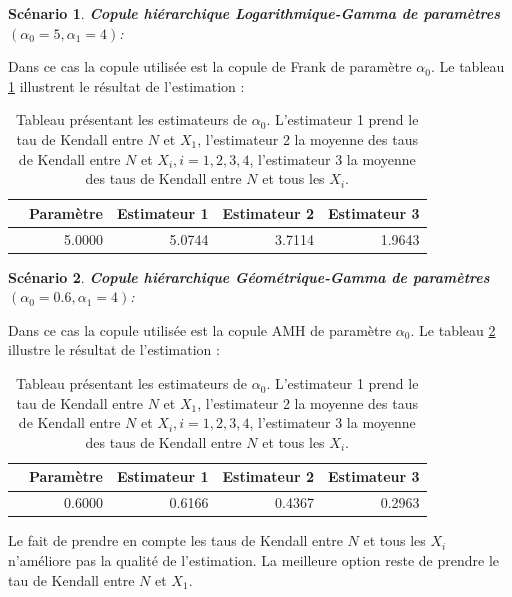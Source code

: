 \documentclass{article}
\newtheorem{scenario}{Scénario}
\begin{document}
	\begin{scenario}
		\textbf{Copule hiérarchique Logarithmique-Gamma de paramètres $(\alpha_{0}=5,\alpha_{1}=4)$}:
		\label{scenario_log-gamma}
	\end{scenario}
	
	Dans ce cas la copule utilisée est la copule de Frank de paramètre $\alpha_{0}$. Le tableau \ref{MCR_Frank} illustrent le résultat de l'estimation :
	
	\begin{table}[ht]
		\centering
		\begin{tabular}{rrrrr}
			\hline
			& Paramètre & Estimateur 1 & Estimateur 2 & Estimateur 3 \\ 
			\hline
			& 5.0000 & 5.0744 & 3.7114 & 1.9643 \\
			\hline
		\end{tabular}
		\caption{Tableau présentant les estimateurs de $\alpha_{0}$. L'estimateur 1 prend le tau de Kendall entre $N$ et $X_{1}$, l'estimateur 2 la moyenne des taus de Kendall entre $N$ et $X_{i},i=1,2,3,4$, l'estimateur 3 la moyenne des taus de Kendall entre $N$ et tous les $X_{i}$. }
		\label{MCR_Frank}
	\end{table}
	
	\begin{scenario}
		\textbf{Copule hiérarchique Géométrique-Gamma de paramètres $(\alpha_{0}=0.6,\alpha_{1}=4)$}:
		\label{scenario_geo-gamma}
	\end{scenario}
	
	Dans ce cas la copule utilisée est la copule AMH de paramètre $\alpha_{0}$. Le tableau \ref{MCR_AMH} illustre le résultat de l'estimation :
	
	\begin{table}[ht]
		\centering
		\begin{tabular}{rrrrr}
			\hline
			& Paramètre & Estimateur 1 & Estimateur 2 & Estimateur 3 \\ 
			\hline
			& 0.6000 & 0.6166 & 0.4367 &  0.2963 \\
			\hline
		\end{tabular}
		\caption{Tableau présentant les estimateurs de $\alpha_{0}$. L'estimateur 1 prend le tau de Kendall entre $N$ et $X_{1}$, l'estimateur 2 la moyenne des taus de Kendall entre $N$ et $X_{i},i=1,2,3,4$, l'estimateur 3 la moyenne des taus de Kendall entre $N$ et tous les $X_{i}$. }
		\label{MCR_AMH}
	\end{table}
	
	Le fait de prendre en compte les taus de Kendall entre $N$ et tous les $X_{i}$ n'améliore pas la qualité de l'estimation. La meilleure option reste de prendre le tau de Kendall entre $N$ et $X_{1}$.
\end{document}

